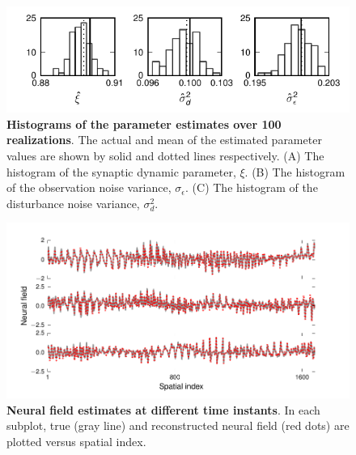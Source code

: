 \documentclass[]{article}
\begin{document}
\begin{figure}[!ht]
\begin{center}
\includegraphics{./Figures/Histogram.pdf}
\end{center}
\caption{{\bf Histograms of the parameter estimates over 100 realizations}. The actual and mean of the estimated parameter values are shown by solid and dotted lines respectively. (A) The histogram of the synaptic dynamic parameter, $\xi$. (B) The histogram of the observation noise variance, $\sigma_{\epsilon}$. (C) The histogram of the disturbance noise variance, $\sigma_d^2$.}
\label{fig:Histogram}
\end{figure}
\begin{figure}[!ht]
\begin{center}
\includegraphics[scale=1]{./Figures/FieldEstimates.pdf}
\end{center}
\caption{{\bf Neural field estimates at different time instants}. In each subplot, true (gray line) and reconstructed neural field (red dots) are plotted versus spatial index.}
\label{fig:FieldEstimates}
\end{figure}
\end{document}
